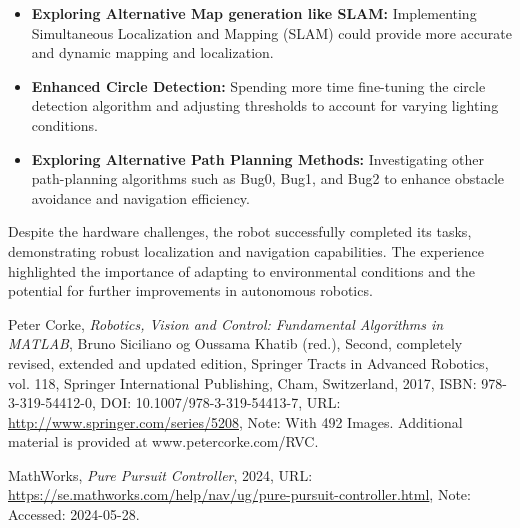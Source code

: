 \documentclass{article}
\begin{document}
	\begin{itemize}
		\item \textbf{Exploring Alternative Map generation like SLAM:} Implementing Simultaneous Localization and Mapping (SLAM) could provide more accurate and dynamic mapping and localization.
		\item \textbf{Enhanced Circle Detection:} Spending more time fine-tuning the circle detection algorithm and adjusting thresholds to account for varying lighting conditions.
		\item \textbf{Exploring Alternative Path Planning Methods:} Investigating other path-planning algorithms such as Bug0, Bug1, and Bug2 to enhance obstacle avoidance and navigation efficiency.
	\end{itemize}
	Despite the hardware challenges, the robot successfully completed its tasks, demonstrating robust localization and navigation capabilities. The experience highlighted the importance of adapting to environmental conditions and the potential for further improvements in autonomous robotics.
	\begin{thebibliography}{9}
		
		Peter Corke,
		\textit{Robotics, Vision and Control: Fundamental Algorithms in MATLAB},
		Bruno Siciliano og Oussama Khatib (red.),
		Second, completely revised, extended and updated edition,
		Springer Tracts in Advanced Robotics, vol. 118,
		Springer International Publishing, Cham, Switzerland,
		2017,
		ISBN: 978-3-319-54412-0,
		DOI: 10.1007/978-3-319-54413-7,
		URL: \url{http://www.springer.com/series/5208},
		Note: With 492 Images. Additional material is provided at www.petercorke.com/RVC.
		
		MathWorks,
		\textit{Pure Pursuit Controller},
		2024,
		URL: \url{https://se.mathworks.com/help/nav/ug/pure-pursuit-controller.html},
		Note: Accessed: 2024-05-28.
		
	\end{thebibliography}
	
	
	
	\clearpage
	\appendix
\end{document}

